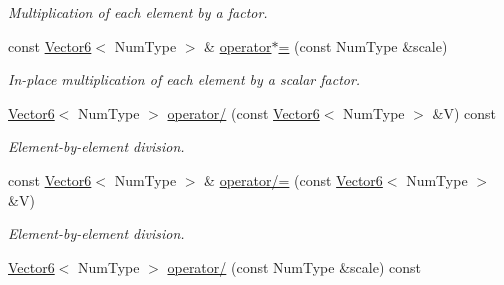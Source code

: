 \begin{DoxyCompactItemize}
\begin{DoxyCompactList}\small\item\em Multiplication of each element by a factor. \end{DoxyCompactList}\item 
\hypertarget{singletonscrews_1_1_vector6_afa58f9de1e7c047ea8b4cbb91c87bc19}{const \hyperlink{singletonscrews_1_1_vector6}{Vector6}$<$ Num\+Type $>$ \& \hyperlink{singletonscrews_1_1_vector6_afa58f9de1e7c047ea8b4cbb91c87bc19}{operator$\ast$=} (const Num\+Type \&scale)}\label{singletonscrews_1_1_vector6_afa58f9de1e7c047ea8b4cbb91c87bc19}

\begin{DoxyCompactList}\small\item\em In-\/place multiplication of each element by a scalar factor. \end{DoxyCompactList}\item 
\hypertarget{singletonscrews_1_1_vector6_acb0550a17b1205985484385edf49b5ce}{\hyperlink{singletonscrews_1_1_vector6}{Vector6}$<$ Num\+Type $>$ \hyperlink{singletonscrews_1_1_vector6_acb0550a17b1205985484385edf49b5ce}{operator/} (const \hyperlink{singletonscrews_1_1_vector6}{Vector6}$<$ Num\+Type $>$ \&V) const }\label{singletonscrews_1_1_vector6_acb0550a17b1205985484385edf49b5ce}

\begin{DoxyCompactList}\small\item\em Element-\/by-\/element division. \end{DoxyCompactList}\item 
\hypertarget{singletonscrews_1_1_vector6_a77a61afa8c5fcb699662f6069808c943}{const \hyperlink{singletonscrews_1_1_vector6}{Vector6}$<$ Num\+Type $>$ \& \hyperlink{singletonscrews_1_1_vector6_a77a61afa8c5fcb699662f6069808c943}{operator/=} (const \hyperlink{singletonscrews_1_1_vector6}{Vector6}$<$ Num\+Type $>$ \&V)}\label{singletonscrews_1_1_vector6_a77a61afa8c5fcb699662f6069808c943}

\begin{DoxyCompactList}\small\item\em Element-\/by-\/element division. \end{DoxyCompactList}\item 
\hypertarget{singletonscrews_1_1_vector6_a183b46061594bb1e9d7ed228a90a47e1}{\hyperlink{singletonscrews_1_1_vector6}{Vector6}$<$ Num\+Type $>$ \hyperlink{singletonscrews_1_1_vector6_a183b46061594bb1e9d7ed228a90a47e1}{operator/} (const Num\+Type \&scale) const }\label{singletonscrews_1_1_vector6_a183b46061594bb1e9d7ed228a90a47e1}


\end{DoxyCompactItemize}
